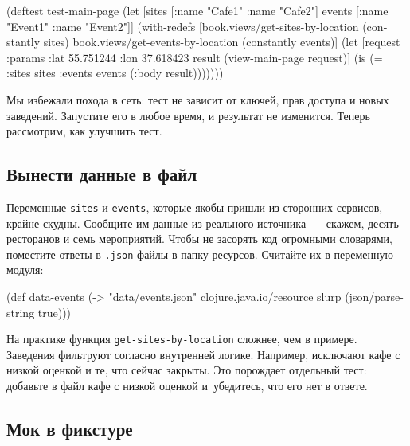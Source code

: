 \else

\begin{english}
  \begin{clojure}
(deftest test-main-page
  (let [sites [{:name "Cafe1"} {:name "Cafe2"}]
        events [{:name "Event1"} {:name "Event2"}]]
    (with-redefs
      [book.views/get-sites-by-location (constantly sites)
       book.views/get-events-by-location (constantly events)]
      (let [request {:params {:lat 55.751244
                              :lon 37.618423}}
            result (view-main-page request)]
        (is (= {:sites sites :events events}
               (:body result)))))))
  \end{clojure}
\end{english}

\fi

Мы избежали похода в сеть: тест не зависит от ключей, прав доступа и новых
заведений. Запустите его в любое время, и результат не изменится. Теперь
рассмотрим, как улучшить тест.

\subsection{Вынести данные в файл}

Переменные \verb|sites| и \verb|events|, которые якобы пришли из сторонних
сервисов, крайне скудны. Сообщите им данные из реального источника~--- скажем,
десять ресторанов и семь мероприятий. Чтобы не засорять код огромными словарями,
поместите ответы в \verb|.json|-файлы в папку ресурсов. Считайте их в переменную
модуля:


\begin{english}
  \begin{clojure}
(def data-events
  (-> "data/events.json"
      clojure.java.io/resource
      slurp
      (json/parse-string true)))
  \end{clojure}
\end{english}

На практике функция \verb|get-sites-by-location| сложнее, чем в
примере. Заведения фильтруют согласно внутренней логике. Например, исключают
кафе с низкой оценкой и те, что сейчас закрыты. Это порождает отдельный тест:
добавьте в файл кафе с низкой оценкой и~убедитесь, что его нет в ответе.

\subsection{Мок в фикстуре}

